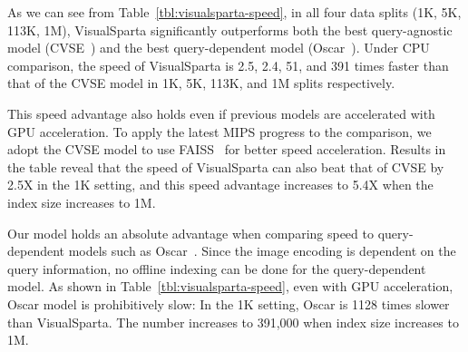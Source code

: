 As we can see from Table~\ref{tbl:visualsparta-speed}, in all four data splits (1K, 5K, 113K, 1M), VisualSparta significantly outperforms both the best query-agnostic model (CVSE~\cite{wang2020consensus}) and the best query-dependent model (Oscar~\cite{li2020oscar}). Under CPU comparison, the speed of VisualSparta is 2.5, 2.4, 51, and 391 times faster than that of the CVSE model in 1K, 5K, 113K, and 1M splits respectively.

This speed advantage also holds even if previous models are accelerated with GPU acceleration. To apply the latest MIPS progress to the comparison, we adopt the CVSE model to use FAISS~\cite{johnson2019billion} for better speed acceleration. Results in the table reveal that the speed of VisualSparta can also beat that of CVSE by 2.5X in the 1K setting, and this speed advantage increases to 5.4X when the index size increases to 1M. 

Our model holds an absolute advantage when comparing speed to query-dependent models such as Oscar~\cite{li2020oscar}. Since the image encoding is dependent on the query information, no offline indexing can be done for the query-dependent model. As shown in Table~\ref{tbl:visualsparta-speed}, even with GPU acceleration, Oscar model is prohibitively slow: In the 1K setting, Oscar is 1128 times slower than VisualSparta. The number increases to 391,000 when index size increases to 1M. 








